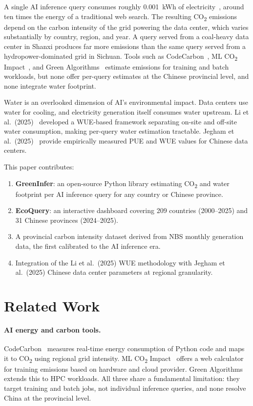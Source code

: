 \documentclass[11pt,a4paper]{article}
\begin{document}
A single AI inference query consumes roughly 0.001~kWh of
electricity~\cite{patterson2021}, around ten times the energy of a
traditional web search. The resulting CO\textsubscript{2} emissions depend
on the carbon intensity of the grid powering the data center, which varies
substantially by country, region, and year. A query served from a
coal-heavy data center in Shanxi produces far more emissions than the same
query served from a hydropower-dominated grid in Sichuan. Tools such as
CodeCarbon~\cite{codecarbon}, ML CO\textsubscript{2}
Impact~\cite{mlco2impact}, and Green Algorithms~\cite{greenalgorithms}
estimate emissions for training and batch workloads, but none offer
per-query estimates at the Chinese provincial level, and none integrate
water footprint.

Water is an overlooked dimension of AI's environmental impact. Data centers
use water for cooling, and electricity generation itself consumes water
upstream. Li et al.\ (2025)~\cite{li2025} developed a WUE-based framework
separating on-site and off-site water consumption, making per-query water
estimation tractable. Jegham et al.\ (2025)~\cite{jegham2025} provide
empirically measured PUE and WUE values for Chinese data centers.

This paper contributes:
\begin{enumerate}
  \item \textbf{GreenInfer}: an open-source Python library estimating
        CO\textsubscript{2} and water footprint per AI inference query for
        any country or Chinese province.
  \item \textbf{EcoQuery}: an interactive dashboard covering 209 countries
        (2000--2025) and 31 Chinese provinces (2024--2025).
  \item A provincial carbon intensity dataset derived from NBS monthly
        generation data, the first calibrated to the AI inference era.
  \item Integration of the Li et al.\ (2025) WUE methodology with
        Jegham et al.\ (2025) Chinese data center parameters at regional granularity.
\end{enumerate}

\section{Related Work}

\paragraph{AI energy and carbon tools.}
CodeCarbon~\cite{codecarbon} measures real-time energy consumption of Python
code and maps it to CO\textsubscript{2} using regional grid intensity.
ML CO\textsubscript{2} Impact~\cite{mlco2impact} offers a web calculator for
training emissions based on hardware and cloud provider.
Green Algorithms~\cite{greenalgorithms} extends this to HPC workloads. All
three share a fundamental limitation: they target training and batch jobs,
not individual inference queries, and none resolve China at the provincial
level.
\end{document}
